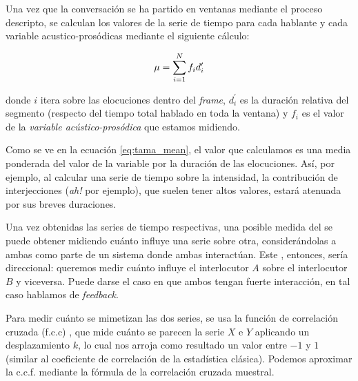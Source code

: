 Una vez que la conversación se ha partido en ventanas mediante el proceso descripto, se calculan los valores de la serie de tiempo para cada hablante y cada variable acustico-prosódicas mediante el siguiente cálculo:

\begin{equation}
    \mu = \sum\limits_{i=1}^N f_i d_i^\prime \label{eq:tama_mean}\\
\end{equation}

\noindent donde $i$ itera sobre las elocuciones dentro del \emph{frame}, $d_i^\prime$ es la duración relativa del segmento (respecto del tiempo total hablado en toda la ventana) y $f_i$ es el valor de la \emph{variable acústico-prosódica} que estamos midiendo.

Como se ve en la ecuación \ref{eq:tama_mean}, el valor que calculamos es una media ponderada del valor de la variable por la duración de las elocuciones. Así, por ejemplo, al calcular una serie de tiempo sobre la intensidad, la contribución de interjecciones (\emph{ah!} por ejemplo), que suelen tener altos valores, estará atenuada por sus breves duraciones.

\newcommand{\squarederr}[1]{
    \sum\limits_{t=1}^n \varnorm{#1}^2
}

\newcommand{\crosscorr}[2]{
  \frac{\sum\limits_{t=|k|+1}^n \varnorm{#1} (#2_{t-k} - \mu_{#2})}{
    \sqrt{\squarederr{#1} \squarederr{#2}}
  } \\
}

\newcommand{\corrdenom}{\sqrt{\squarederr{A}\squarederr{B}}}


Una vez obtenidas las series de tiempo respectivas, una posible medida del \entrainment se puede obtener midiendo cuánto influye una serie sobre otra, considerándolas a ambas como parte de un sistema donde ambas interactúan. Este \entrainment, entonces, sería direccional: queremos medir cuánto influye el interlocutor $A$ sobre el interlocutor $B$ y viceversa. Puede darse el caso en que ambos tengan fuerte interacción, en tal caso hablamos de \emph{feedback}.

Para medir cuánto se mimetizan las dos series, se usa la función de correlación cruzada (f.c.c) \cite{CHATFIELD}, que mide cuánto se parecen la serie $X$ e $Y$ aplicando un desplazamiento $k$, lo cual nos arroja como resultado un valor entre $-1$ y $1$ (similar al coeficiente de correlación de la estadística clásica). Podemos aproximar la c.c.f. mediante la fórmula de la correlación cruzada muestral.

